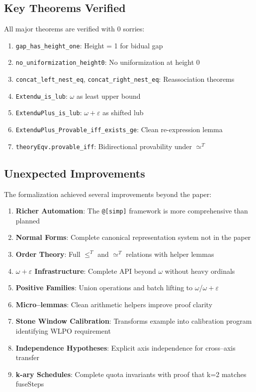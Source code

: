 \documentclass[11pt]{article}
\theoremstyle{definition}
\theoremstyle{remark}
\newcommand{\lean}[1]{\texttt{#1}}
\begin{document}
\subsection{Key Theorems Verified}

All major theorems are verified with 0 sorries:
\begin{enumerate}
\item \lean{gap\_has\_height\_one}: Height = 1 for bidual gap
\item \lean{no\_uniformization\_height0}: No uniformization at height 0
\item \lean{concat\_left\_nest\_eq}, \lean{concat\_right\_nest\_eq}: Reassociation theorems
\item \lean{Extendω\_is\_lub}: $\omega$ as least upper bound
\item \lean{ExtendωPlus\_is\_lub}: $\omega+\varepsilon$ as shifted lub
\item \lean{ExtendωPlus\_Provable\_iff\_exists\_ge}: Clean re-expression lemma
\item \lean{theoryEqv.provable\_iff}: Bidirectional provability under $\simeq^T$
\end{enumerate}

\subsection{Unexpected Improvements}

The formalization achieved several improvements beyond the paper:

\begin{enumerate}
\item \textbf{Richer Automation}: The \texttt{@[simp]} framework is more comprehensive than planned
\item \textbf{Normal Forms}: Complete canonical representation system not in the paper
\item \textbf{Order Theory}: Full $\leq^T$ and $\simeq^T$ relations with helper lemmas
\item \textbf{$\omega+\varepsilon$ Infrastructure}: Complete API beyond $\omega$ without heavy ordinals
\item \textbf{Positive Families}: Union operations and batch lifting to $\omega$/$\omega+\varepsilon$
\item \textbf{Micro--lemmas}: Clean arithmetic helpers improve proof clarity
\item \textbf{Stone Window Calibration}: Transforms example into calibration program identifying WLPO requirement
\item \textbf{Independence Hypotheses}: Explicit axis independence for cross--axis transfer
\item \textbf{k-ary Schedules}: Complete quota invariants with proof that k=2 matches fuseSteps
\end{enumerate}
\end{document}
